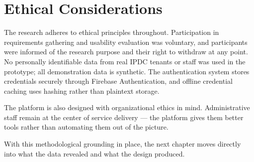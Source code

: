 \section{Ethical Considerations}

The research adheres to ethical principles throughout. Participation in requirements gathering and usability evaluation was voluntary, and participants were informed of the research purpose and their right to withdraw at any point. No personally identifiable data from real IPDC tenants or staff was used in the prototype; all demonstration data is synthetic. The authentication system stores credentials securely through Firebase Authentication, and offline credential caching uses hashing rather than plaintext storage.

The platform is also designed with organizational ethics in mind. Administrative staff remain at the center of service delivery --- the platform gives them better tools rather than automating them out of the picture.

With this methodological grounding in place, the next chapter moves directly into what the data revealed and what the design produced.
